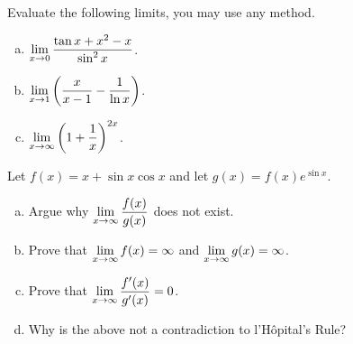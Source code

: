 \question Evaluate the following limits, you may use any method.
\begin{enumerate}[(a)]
  \item $\displaystyle\lim_{x\to0}\frac{\tan x + x^2 - x}{\sin^2 x}$.
  \item $\displaystyle\lim_{x\to1}\left(\frac{x}{x-1} - \frac{1}{\ln x}\right)$.
  \item $\displaystyle\lim_{x\to\infty}\left(1 + \frac{1}{x}\right)^{2x}$.
\end{enumerate}


\question Let $f(x) = x + \sin x \cos x$ and let $g(x) = f(x)e^{\sin x}$.
\begin{enumerate}[(a)]
  \item Argue why $\displaystyle\lim_{x\to\infty}\frac{f(x)}{g(x)}$ does not exist.
  \item Prove that $\displaystyle\lim_{x\to\infty}f(x) = \infty$ and $\displaystyle\lim_{x\to\infty}g(x) = \infty$.
  \item Prove that $\displaystyle\lim_{x\to\infty}\frac{f'(x)}{g'(x)} = 0$.
  \item Why is the above not a contradiction to l'Hôpital's Rule?
\end{enumerate}


